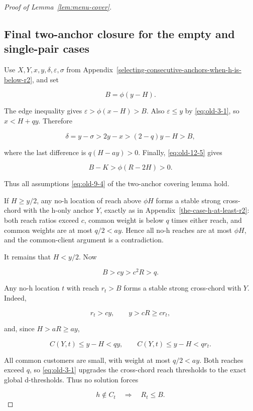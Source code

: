 \documentclass[11pt]{amsart}
\numberwithin{equation}{section}
\theoremstyle{definition}
\begin{document}
\begin{proof}[Proof of Lemma~\ref{lem:menu-cover}]
\subsection{Final two-anchor closure for the empty and single-pair cases}\label{final-two-anchor-closure-for-the-empty-and-single-pair-cases}

Use \(X,Y,x,y,\delta,\varepsilon,\sigma\) from Appendix~\ref{selecting-consecutive-anchors-when-h-is-below-r2}, and set

\[
B=\phi(y-H).
\]

The edge inequality gives \(\varepsilon>\phi(x-H)>B\). Also \(\varepsilon\le y\) by \eqref{eq:old-3-1}, so \(x<H+qy\). Therefore

\[
\delta=y-\sigma>2y-x>(2-q)y-H>B,
\]

where the last difference is \(q(H-ay)>0\). Finally, \eqref{eq:old-12-5} gives

\begin{equation}
B-K>\phi(R-2H)>0. \label{eq:old-13-1}
\end{equation}

Thus all assumptions \eqref{eq:old-9-4} of the two-anchor covering lemma hold.

If \(H\ge y/2\), any no-h location of reach above \(\phi H\) forms a stable strong cross-chord with the h-only anchor \(Y\), exactly as in Appendix~\ref{the-case-h-at-least-r2}: both reach ratios exceed \(c\), common weight is below \(q\) times either reach, and common weights are at most \(q/2<a y\). Hence all no-h reaches are at most \(\phi H\), and the common-client argument is a contradiction.

It remains that \(H<y/2\). Now

\begin{equation}
B>cy>c^2R>q. \label{eq:old-13-2}
\end{equation}

Any no-h location \(t\) with reach \(r_t>B\) forms a stable strong cross-chord with \(Y\). Indeed,

\[
r_t>cy,\qquad y>cR\ge cr_t,
\]

and, since \(H>aR\ge ay\),

\[
C(Y,t)\le y-H<qy,\qquad C(Y,t)\le y-H<qr_t.
\]

All common customers are small, with weight at most \(q/2<a y\). Both reaches exceed \(q\), so \eqref{eq:old-3-1} upgrades the cross-chord reach thresholds to the exact global d-thresholds. Thus no solution forces

\begin{equation}
h\notin C_t\quad\Longrightarrow\quad R_t\le B. \label{eq:old-13-3}
\end{equation}


\end{proof}
\end{document}

